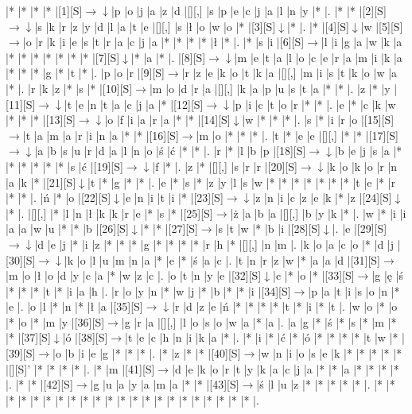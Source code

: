 \documentclass[11pt]{article}
\newcommand\drarr{$\rightarrow \!\!\!\!\! \downarrow$}
\newcommand\rarr{$\rightarrow$}
\newcommand\darr{$\downarrow$}
\begin{document}
\noindent\begin{Puzzle}{21}{29}|*	|*	|*	|*	|[1][S]\drarr	|p	|o	|j	|a	|z	|d	|[][,]{ }	|s	|p	|e	|c	|j	|a	|l	|n	|y	|*	|.
|*	|*	|[2][S]\drarr	|s	|k	|r	|z	|y	|d	|l	|a	|t	|e	|[][,]{ }	|s	|ł	|o	|w	|o	|*	|[3][S]\darr	|*	|.
|*	|[4][S]\darr	|w	|[5][S]\rarr	|o	|r	|k	|i	|e	|s	|t	|r	|a	|c	|j	|a	|*	|*	|*	|*	|ł	|*	|.
|*	|s	|i	|[6][S]\rarr	|l	|i	|g	|a	|w	|k	|a	|*	|*	|*	|*	|*	|*	|*	|[7][S]\darr	|*	|a	|*	|.
|[8][S]\drarr	|m	|e	|t	|a	|l	|o	|c	|e	|r	|a	|m	|i	|k	|a	|*	|*	|*	|g	|*	|t	|*	|.
|p	|o	|r	|[9][S]\rarr	|r	|z	|e	|k	|o	|t	|k	|a	|[][,]{ }	|m	|i	|s	|t	|k	|o	|w	|a	|*	|.
|r	|k	|z	|*	|s	|*	|[10][S]\rarr	|m	|o	|d	|r	|a	|[][,]{ }	|k	|a	|p	|u	|s	|t	|a	|*	|*	|.
|z	|*	|y	|[11][S]\drarr	|t	|e	|n	|t	|a	|c	|j	|a	|*	|[12][S]\drarr	|p	|i	|c	|t	|o	|r	|*	|*	|.
|e	|*	|c	|k	|w	|*	|*	|*	|[13][S]\drarr	|o	|f	|i	|a	|r	|a	|*	|*	|[14][S]\darr	|w	|*	|*	|*	|.
|s	|*	|i	|r	|o	|[15][S]\rarr	|t	|a	|m	|a	|r	|i	|n	|a	|*	|*	|[16][S]\rarr	|m	|o	|*	|*	|*	|.
|t	|*	|e	|e	|[][,]{ }	|*	|*	|[17][S]\drarr	|a	|b	|s	|u	|r	|d	|a	|l	|n	|o	|ś	|ć	|*	|*	|.
|r	|*	|l	|b	|p	|[18][S]\drarr	|b	|e	|j	|s	|a	|*	|*	|*	|*	|*	|*	|s	|ć	|[19][S]\drarr	|f	|*	|.
|z	|*	|[][,]{ }	|s	|r	|r	|[20][S]\drarr	|k	|o	|k	|o	|r	|n	|a	|k	|*	|[21][S]\darr	|t	|*	|g	|*	|*	|.
|e	|*	|s	|*	|z	|y	|l	|s	|w	|*	|*	|*	|*	|*	|*	|*	|t	|e	|*	|r	|*	|*	|.
|ń	|*	|o	|[22][S]\darr	|e	|n	|i	|t	|i	|*	|[23][S]\drarr	|z	|n	|i	|c	|z	|e	|k	|*	|z	|[24][S]\darr	|*	|.
|[][,]{ }	|*	|l	|n	|ł	|k	|k	|r	|e	|*	|s	|*	|[25][S]\rarr	|ż	|a	|b	|a	|[][,]{ }	|b	|y	|k	|*	|.
|w	|*	|i	|i	|a	|a	|w	|u	|*	|*	|b	|[26][S]\darr	|*	|*	|[27][S]\rarr	|s	|t	|w	|*	|b	|i	|[28][S]\darr	|.
|e	|[29][S]\drarr	|d	|e	|j	|*	|i	|z	|*	|*	|*	|g	|*	|*	|*	|*	|r	|h	|*	|[][,]{ }	|n	|m	|.
|k	|o	|a	|c	|o	|*	|d	|j	|[30][S]\drarr	|k	|o	|l	|u	|m	|n	|a	|*	|e	|*	|ś	|a	|c	|.
|t	|n	|r	|z	|w	|*	|a	|a	|d	|[31][S]\rarr	|m	|o	|ł	|o	|d	|y	|c	|a	|*	|w	|z	|c	|.
|o	|t	|n	|y	|e	|[32][S]\darr	|c	|*	|o	|*	|[33][S]\rarr	|g	|ę	|ś	|*	|*	|*	|t	|*	|i	|a	|h	|.
|r	|o	|y	|n	|*	|w	|j	|*	|b	|*	|*	|i	|[34][S]\rarr	|p	|a	|t	|i	|s	|o	|n	|*	|e	|.
|o	|l	|*	|n	|*	|ł	|a	|[35][S]\drarr	|r	|d	|z	|e	|ń	|*	|*	|*	|*	|t	|*	|i	|*	|t	|.
|w	|o	|*	|o	|*	|o	|*	|m	|y	|[36][S]\rarr	|g	|r	|a	|[][,]{ }	|l	|o	|s	|o	|w	|a	|*	|a	|.
|a	|g	|*	|ś	|*	|s	|*	|m	|*	|*	|[37][S]\darr	|ó	|[38][S]\rarr	|t	|e	|c	|h	|n	|i	|k	|a	|*	|.
|*	|i	|*	|ć	|*	|ó	|*	|*	|*	|*	|t	|w	|*	|[39][S]\rarr	|o	|b	|i	|e	|g	|*	|*	|*	|.
|*	|z	|*	|*	|[40][S]\rarr	|w	|n	|i	|o	|s	|e	|k	|*	|*	|*	|*	|*	|[][S]'	|*	|*	|*	|*	|.
|*	|m	|[41][S]\rarr	|d	|e	|k	|o	|r	|t	|y	|k	|a	|c	|j	|a	|*	|*	|a	|*	|*	|*	|*	|.
|*	|*	|[42][S]\rarr	|g	|u	|a	|y	|a	|m	|a	|*	|*	|[43][S]\rarr	|ś	|l	|u	|z	|*	|*	|*	|*	|*	|.
|*	|*	|*	|*	|*	|*	|*	|*	|*	|*	|*	|*	|*	|*	|*	|*	|*	|*	|*	|*	|*	|*	|.\end{Puzzle}
\end{document}
